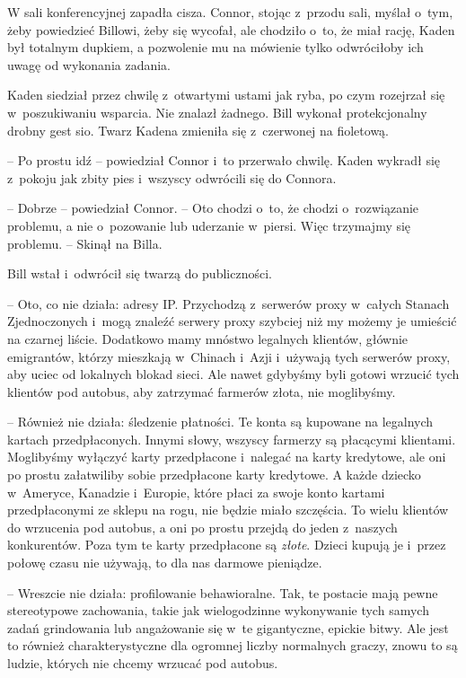 \documentclass[oneside,polish,11pt,rmheadings]{mwbk}
\begin{document}
W sali konferencyjnej zapadła cisza. Connor, stojąc z~przodu sali, myślał o~tym, żeby powiedzieć Billowi, żeby się wycofał, ale chodziło o~to, że miał rację, Kaden był totalnym dupkiem, a pozwolenie mu na mówienie tylko odwróciłoby ich uwagę od wykonania zadania.

Kaden siedział przez chwilę z~otwartymi ustami jak ryba, po czym rozejrzał się w~poszukiwaniu wsparcia. Nie znalazł żadnego. Bill wykonał protekcjonalny drobny gest sio. Twarz Kadena zmieniła się z~czerwonej na fioletową.

-- Po prostu idź -- powiedział Connor i~to przerwało chwilę. Kaden wykradł się z~pokoju jak zbity pies i~wszyscy odwrócili się do Connora.

-- Dobrze -- powiedział Connor. -- Oto chodzi o~to, że chodzi o~rozwiązanie problemu, a nie o~pozowanie lub uderzanie w~piersi. Więc trzymajmy się problemu. -- Skinął na Billa.

Bill wstał i~odwrócił się twarzą do publiczności. 

-- Oto, co nie działa: adresy IP. Przychodzą z~serwerów proxy w~całych Stanach Zjednoczonych i~mogą znaleźć serwery proxy szybciej niż my możemy je umieścić na czarnej liście. Dodatkowo mamy mnóstwo legalnych klientów, głównie emigrantów, którzy mieszkają w~Chinach i~Azji i~używają tych serwerów proxy, aby uciec od lokalnych blokad sieci. Ale nawet gdybyśmy byli gotowi wrzucić tych klientów pod autobus, aby zatrzymać farmerów złota, nie moglibyśmy.

-- Również nie działa: śledzenie płatności. Te konta są kupowane na legalnych kartach przedpłaconych. Innymi słowy, wszyscy farmerzy są płacącymi klientami. Moglibyśmy wyłączyć karty przedpłacone i~nalegać na karty kredytowe, ale oni po prostu załatwiliby sobie przedpłacone karty kredytowe. A każde dziecko w~Ameryce, Kanadzie i~Europie, które płaci za swoje konto kartami przedpłaconymi ze sklepu na rogu, nie będzie miało szczęścia. To wielu klientów do wrzucenia pod autobus, a oni po prostu przejdą do jeden z~naszych konkurentów. Poza tym te karty przedpłacone są \textit{złote}. Dzieci kupują je i~przez połowę czasu nie używają, to dla nas darmowe pieniądze.

-- Wreszcie nie działa: profilowanie behawioralne. Tak, te postacie mają pewne stereotypowe zachowania, takie jak wielogodzinne wykonywanie tych samych zadań grindowania lub angażowanie się w~te gigantyczne, epickie bitwy. Ale jest to również charakterystyczne dla ogromnej liczby normalnych graczy, znowu to są ludzie, których nie chcemy wrzucać pod autobus.
\end{document}
